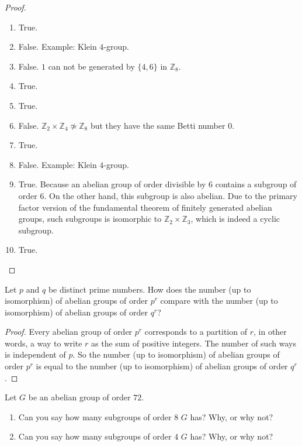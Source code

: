 \begin{proof}
    \begin{enumerate}[label={\textbf{\arabic*.}}]
        \item True.
        \item False. Example: Klein $4$-group.
        \item False. $1$ can not be generated by $\{ 4, 6 \}$ in $\mathbb{Z}_{8}$.
        \item True.
        \item True.
        \item False. $\mathbb{Z}_{2}\times\mathbb{Z}_{4} \not\simeq \mathbb{Z}_{8}$ but they have the same Betti number $0$.
        \item True.
        \item False. Example: Klein $4$-group.
        \item True. Because an abelian group of order divisible by $6$ contains a subgroup of order $6$. On the other hand, this subgroup is also abelian. Due to the primary factor version of the fundamental theorem of finitely generated abelian groups, such subgroups is isomorphic to $\mathbb{Z}_{2}\times\mathbb{Z}_{3}$, which is indeed a cyclic subgroup.
        \item True.
    \end{enumerate}
\end{proof}

\newpage
\begin{exercise}
    Let $p$ and $q$ be distinct prime numbers. How does the number (up to isomorphism) of abelian groups of order $p^{r}$ compare with the number (up to isomorphism) of abelian groups of order $q^{r}$?
\end{exercise}

\begin{proof}
    Every abelian group of order $p^{r}$ corresponds to a partition of $r$, in other words, a way to write $r$ as the sum of positive integers. The number of such ways is independent of $p$. So the number (up to isomorphism) of abelian groups of order $p^{r}$ is equal to the number (up to isomorphism) of abelian groups of order $q^{r}$.
\end{proof}

\newpage
\begin{exercise}
    Let $G$ be an abelian group of order $72$.
    \begin{enumerate}[label={\textbf{\alph*.}}]
        \item Can you say how many subgroups of order $8$ $G$ has? Why, or why not?
        \item Can you say how many subgroups of order $4$ $G$ has? Why, or why not?
    \end{enumerate}
\end{exercise}

